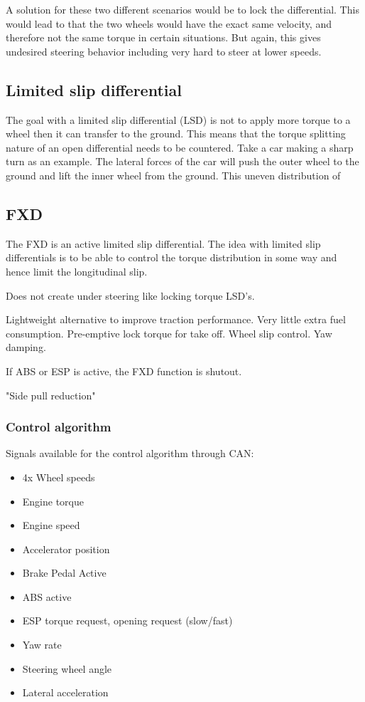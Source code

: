 A solution for these two different scenarios would be to lock the differential. This would lead to that the two wheels would have the exact same velocity, and therefore not the same torque in certain situations. But again, this gives undesired steering behavior including very hard to steer at lower speeds. 

\subsection{Limited slip differential}
The goal with a limited slip differential (LSD) is not to apply more torque to a wheel then it can transfer to the ground. This means that the torque splitting nature of an open differential needs to be countered. Take a car making a sharp turn as an example. The lateral forces of the car will push the outer wheel to the ground and lift the inner wheel from the ground. This uneven distribution of 

\subsection{FXD}
The FXD is an active limited slip differential. The idea with limited slip differentials is to be able to control the torque distribution in some way and hence limit the longitudinal slip. 

Does not create under steering like locking torque LSD's. 

Lightweight alternative  to improve traction performance. Very little extra fuel consumption. Pre-emptive lock torque for take off. Wheel slip control. Yaw damping. 

If ABS or ESP is active, the FXD function is shutout. 

"Side pull reduction"


\subsubsection{Control algorithm}

Signals available for the control algorithm through CAN:
\begin{itemize}
	\item 4x Wheel speeds
	\item Engine torque
	\item Engine speed
	\item Accelerator position
	\item Brake Pedal Active
	\item ABS active
	\item ESP torque request, opening request (slow/fast)
	\item Yaw rate
	\item Steering wheel angle
	\item Lateral acceleration
\end{itemize}

